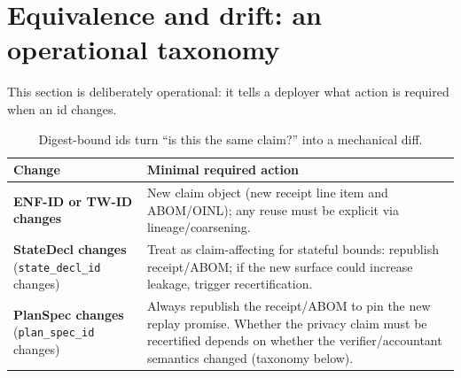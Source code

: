 \documentclass[11pt]{article}
\begin{document}
\section{Equivalence and drift: an operational taxonomy}
This section is deliberately operational: it tells a deployer what action is required when an id changes.

\begin{table}[t]
\centering
\small
\begin{tabularx}{\linewidth}{@{}lX@{}}
\toprule
Change & Minimal required action \\
\midrule
\textbf{ENF-ID or TW-ID changes} & New claim object (new receipt line item and ABOM/OINL); any reuse must be explicit via lineage/coarsening.\cite{series:traceifaces,series:threatwindows}\\
\textbf{StateDecl changes} (\texttt{state\_decl\_id} changes) & Treat as claim-affecting for stateful bounds: republish receipt/ABOM; if the new surface could increase leakage, trigger recertification.\cite{series:state1,series:recert}\\
\textbf{PlanSpec changes} (\texttt{plan\_spec\_id} changes) & Always republish the receipt/ABOM to pin the new replay promise. Whether the privacy claim must be recertified depends on whether the verifier/accountant semantics changed (taxonomy below).\\
\bottomrule
\end{tabularx}
\caption{Digest-bound ids turn ``is this the same claim?'' into a mechanical diff.}
\label{tab:diff}
\end{table}
\end{document}
